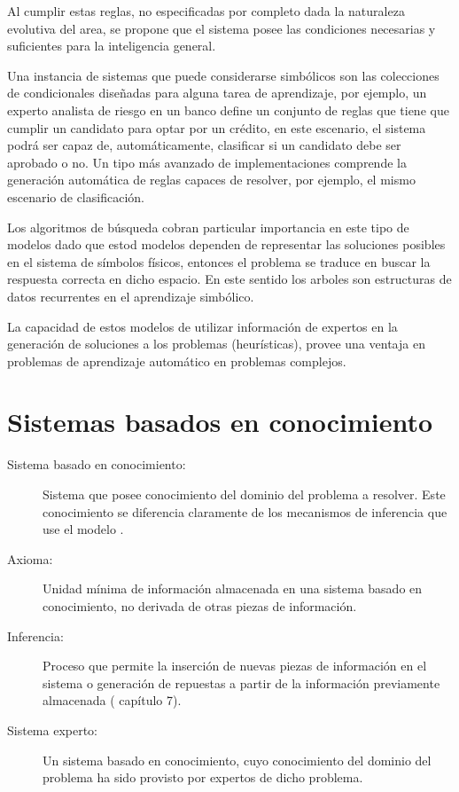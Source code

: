 Al cumplir estas reglas, no especificadas por completo dada la naturaleza evolutiva del area, se propone que el sistema posee las condiciones necesarias y suficientes para la inteligencia general.

Una instancia de sistemas que puede considerarse simb\'olicos son las colecciones de condicionales dise\~nadas para alguna tarea de aprendizaje, por ejemplo, un experto analista de riesgo en un banco define un conjunto de reglas que tiene que cumplir un candidato para optar por un cr\'edito, en este escenario, el sistema podr\'a ser capaz de, automáticamente, clasificar si un candidato debe ser aprobado o no. Un tipo m\'as avanzado de implementaciones comprende la generaci\'on autom\'atica de reglas capaces de resolver, por ejemplo, el mismo escenario de clasificaci\'on.

Los algoritmos de b\'usqueda cobran particular importancia en este tipo de modelos dado que estod modelos dependen de representar las soluciones posibles en el sistema de símbolos físicos, entonces el problema se traduce en buscar la respuesta correcta en dicho espacio. En este sentido los arboles son estructuras de datos recurrentes en el aprendizaje simb\'olico.

La capacidad de estos modelos de utilizar información de expertos en la generación de soluciones a los problemas (heur\'isticas), provee una ventaja en problemas de aprendizaje autom\'atico en problemas complejos.

\section{Sistemas basados en conocimiento}

\begin{description}
\item[Sistema basado en conocimiento:] Sistema que posee conocimiento del dominio del problema a resolver. Este conocimiento se diferencia claramente de los mecanismos de inferencia que use el modelo \citet{Howe1991KnowledgebasedSA}.

\item[Axioma:] Unidad m\'inima de informaci\'on almacenada en una sistema basado en conocimiento, no derivada de otras piezas de informaci\'on. 

\item[Inferencia:] Proceso que permite la inserci\'on de nuevas piezas de informaci\'on en el sistema o generaci\'on de repuestas a partir de la informaci\'on previamente almacenada (\citet{russell2009} cap\'itulo 7).

\item[Sistema experto:] Un sistema basado en conocimiento, cuyo conocimiento del dominio del problema ha sido provisto por expertos de dicho problema.
\end{description}

